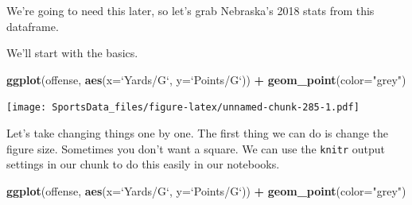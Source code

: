 \documentclass[
]{book}
\newenvironment{Shaded}{\begin{snugshade}}{\end{snugshade}}
\newcommand{\DataTypeTok}[1]{\textcolor[rgb]{0.13,0.29,0.53}{#1}}
\newcommand{\DecValTok}[1]{\textcolor[rgb]{0.00,0.00,0.81}{#1}}
\newcommand{\KeywordTok}[1]{\textcolor[rgb]{0.13,0.29,0.53}{\textbf{#1}}}
\newcommand{\NormalTok}[1]{#1}
\newcommand{\OperatorTok}[1]{\textcolor[rgb]{0.81,0.36,0.00}{\textbf{#1}}}
\newcommand{\StringTok}[1]{\textcolor[rgb]{0.31,0.60,0.02}{#1}}
\begin{document}
\begin{Shaded}
\end{Shaded}

We're going to need this later, so let's grab Nebraska's 2018 stats from this dataframe.

\begin{Shaded}
\end{Shaded}

We'll start with the basics.

\begin{Shaded}
\begin{Highlighting}[]
\KeywordTok{ggplot}\NormalTok{(offense, }\KeywordTok{aes}\NormalTok{(}\DataTypeTok{x=}\StringTok{`}\DataTypeTok{Yards/G}\StringTok{`}\NormalTok{, }\DataTypeTok{y=}\StringTok{`}\DataTypeTok{Points/G}\StringTok{`}\NormalTok{)) }\OperatorTok{+}\StringTok{ }
\StringTok{  }\KeywordTok{geom_point}\NormalTok{(}\DataTypeTok{color=}\StringTok{"grey"}\NormalTok{)}
\end{Highlighting}
\end{Shaded}

\texttt{[image: SportsData\_files/figure-latex/unnamed-chunk-285-1.pdf]}

Let's take changing things one by one. The first thing we can do is change the figure size. Sometimes you don't want a square. We can use the \texttt{knitr} output settings in our chunk to do this easily in our notebooks.

\begin{Shaded}
\begin{Highlighting}[]
\KeywordTok{ggplot}\NormalTok{(offense, }\KeywordTok{aes}\NormalTok{(}\DataTypeTok{x=}\StringTok{`}\DataTypeTok{Yards/G}\StringTok{`}\NormalTok{, }\DataTypeTok{y=}\StringTok{`}\DataTypeTok{Points/G}\StringTok{`}\NormalTok{)) }\OperatorTok{+}\StringTok{ }
\StringTok{  }\KeywordTok{geom_point}\NormalTok{(}\DataTypeTok{color=}\StringTok{"grey"}\NormalTok{)}
\end{Highlighting}
\end{Shaded}
\end{document}
